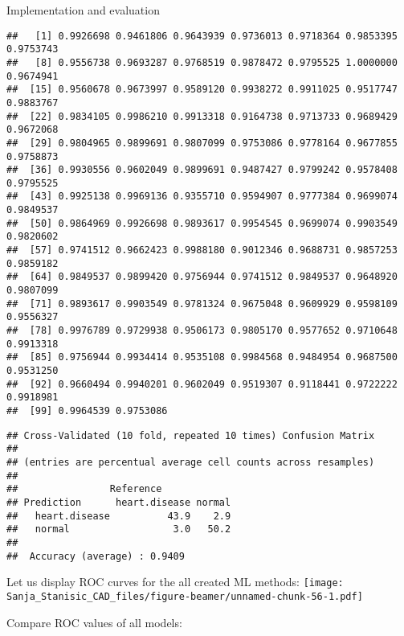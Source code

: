 \documentclass[
  ignorenonframetext,
]{beamer}
\begin{document}
\begin{frame}[fragile]{Implementation and evaluation}
\begin{verbatim}
##   [1] 0.9926698 0.9461806 0.9643939 0.9736013 0.9718364 0.9853395 0.9753743
##   [8] 0.9556738 0.9693287 0.9768519 0.9878472 0.9795525 1.0000000 0.9674941
##  [15] 0.9560678 0.9673997 0.9589120 0.9938272 0.9911025 0.9517747 0.9883767
##  [22] 0.9834105 0.9986210 0.9913318 0.9164738 0.9713733 0.9689429 0.9672068
##  [29] 0.9804965 0.9899691 0.9807099 0.9753086 0.9778164 0.9677855 0.9758873
##  [36] 0.9930556 0.9602049 0.9899691 0.9487427 0.9799242 0.9578408 0.9795525
##  [43] 0.9925138 0.9969136 0.9355710 0.9594907 0.9777384 0.9699074 0.9849537
##  [50] 0.9864969 0.9926698 0.9893617 0.9954545 0.9699074 0.9903549 0.9820602
##  [57] 0.9741512 0.9662423 0.9988180 0.9012346 0.9688731 0.9857253 0.9859182
##  [64] 0.9849537 0.9899420 0.9756944 0.9741512 0.9849537 0.9648920 0.9807099
##  [71] 0.9893617 0.9903549 0.9781324 0.9675048 0.9609929 0.9598109 0.9556327
##  [78] 0.9976789 0.9729938 0.9506173 0.9805170 0.9577652 0.9710648 0.9913318
##  [85] 0.9756944 0.9934414 0.9535108 0.9984568 0.9484954 0.9687500 0.9531250
##  [92] 0.9660494 0.9940201 0.9602049 0.9519307 0.9118441 0.9722222 0.9918981
##  [99] 0.9964539 0.9753086
\end{verbatim}

\begin{verbatim}
## Cross-Validated (10 fold, repeated 10 times) Confusion Matrix 
## 
## (entries are percentual average cell counts across resamples)
##  
##                Reference
## Prediction      heart.disease normal
##   heart.disease          43.9    2.9
##   normal                  3.0   50.2
##                             
##  Accuracy (average) : 0.9409
\end{verbatim}

Let us display ROC curves for the all created ML methods:
\texttt{[image: Sanja\_Stanisic\_CAD\_files/figure-beamer/unnamed-chunk-56-1.pdf]}

Compare ROC values of all models:


\end{frame}
\end{document}

